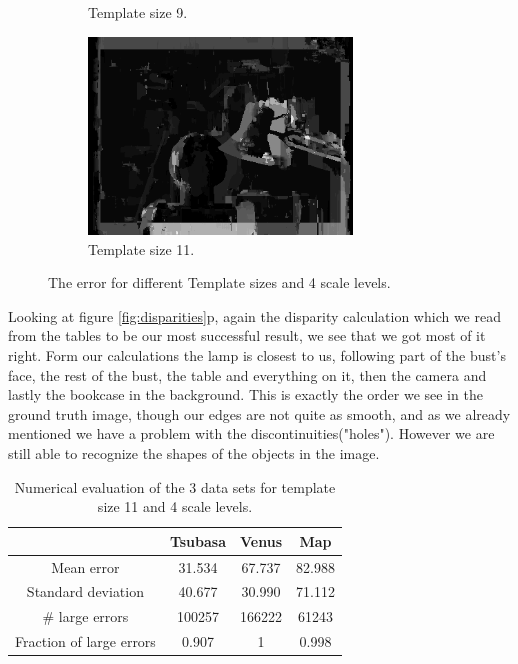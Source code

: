 \documentclass[12pt,a4paper,oneside,final]{article}
\begin{document}
\begin{figure}[H]
\begin{subfigure}[b]{0.5\textwidth}
		\caption{Template size 9.}
	\end{subfigure}%
	\begin{subfigure}[b]{0.5\textwidth}
		\centering
		\includegraphics[width=7cm]{err_s4_k11set_1.png}
		\caption{Template size 11.}
	\end{subfigure}
	\caption{The error for different Template sizes and 4 scale levels.}
	\label{fig:error}
\end{figure}

Looking at figure \ref{fig:disparities}p, again the disparity calculation which we read from the tables to be our most successful result, we see that we got most of it right. Form our calculations the lamp is closest to us, following part of the bust's face, the rest of the bust, the table and everything on it, then the camera and lastly the bookcase in the background. This is exactly the order we see in the ground truth image, though our edges are not quite as smooth, and as we already mentioned we have a problem with the discontinuities("holes"). However we are still able to recognize the shapes of the objects in the image. 

\begin{table}[H]
	\centering
	\begin{tabular}{c||c|c|c}
		&Tsubasa&Venus&Map\\\hline\hline
		Mean error & 31.534 & 67.737 & 82.988 \\\hline
		Standard deviation & 40.677 & 30.990 & 71.112 \\\hline
		\# large errors & 100257 & 166222 & 61243 \\\hline
		Fraction of large errors& 0.907 & 1 & 0.998
	\end{tabular}
	\caption{Numerical evaluation of the 3 data sets for template size 11 and 4 scale levels.}
	\label{tab:numevalAll}
\end{table}
\end{document}
